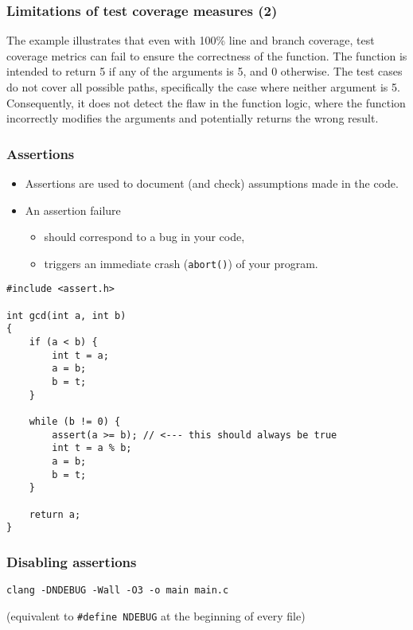 \documentclass[12pt]{article}
\begin{document}
\subsubsection{Limitations of test coverage measures (2)}

The example illustrates that even with 100\% line and branch coverage, test coverage metrics can fail to ensure the correctness of the function. The function is intended to return 5 if any of the arguments is 5, and 0 otherwise. The test cases do not cover all possible paths, specifically the case where neither argument is 5. Consequently, it does not detect the flaw in the function logic, where the function incorrectly modifies the arguments and potentially returns the wrong result.

\subsubsection{Assertions}

\begin{itemize}
    \item Assertions are used to document (and check) assumptions made in the code.
    \item An assertion failure
    \begin{itemize}
        \item should correspond to a bug in your code,
        \item triggers an immediate crash (\texttt{abort()}) of your program.
    \end{itemize}
\end{itemize}
\begin{lstlisting}
#include <assert.h>

int gcd(int a, int b)
{
    if (a < b) {
        int t = a;
        a = b;
        b = t;
    }

    while (b != 0) {
        assert(a >= b); // <--- this should always be true
        int t = a % b;
        a = b;
        b = t;
    }

    return a;
}
\end{lstlisting}

\subsubsection{Disabling assertions}

\begin{lstlisting}
clang -DNDEBUG -Wall -O3 -o main main.c
\end{lstlisting}
(equivalent to \texttt{\#define NDEBUG} at the beginning of every file)
\end{document}
